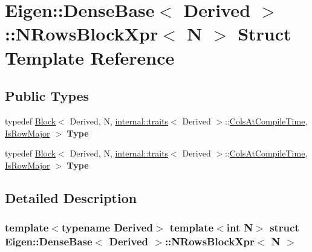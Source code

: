 \hypertarget{struct_eigen_1_1_dense_base_1_1_n_rows_block_xpr}{}\section{Eigen\+:\+:Dense\+Base$<$ Derived $>$\+:\+:N\+Rows\+Block\+Xpr$<$ N $>$ Struct Template Reference}
\label{struct_eigen_1_1_dense_base_1_1_n_rows_block_xpr}
\subsection*{Public Types}
\begin{DoxyCompactItemize}
\item 
\mbox{\label{struct_eigen_1_1_dense_base_1_1_n_rows_block_xpr_ae950c080aaac60c9937a1fedb93f2340}} 
typedef \hyperlink{group___core___module_class_eigen_1_1_block}{Block}$<$ Derived, N, \hyperlink{struct_eigen_1_1internal_1_1traits}{internal\+::traits}$<$ Derived $>$\+::\hyperlink{group___core___module_a9784b8701c2d1c79fa8000e1b3ebdb8bac1b474fd08671c39df677c4acdbc8df0}{Cols\+At\+Compile\+Time}, \hyperlink{group___core___module_a9784b8701c2d1c79fa8000e1b3ebdb8baff2add9b7e8426ba05be33f32806d21c}{Is\+Row\+Major} $>$ {\bfseries Type}
\item 
\mbox{\label{struct_eigen_1_1_dense_base_1_1_n_rows_block_xpr_ae950c080aaac60c9937a1fedb93f2340}} 
typedef \hyperlink{group___core___module_class_eigen_1_1_block}{Block}$<$ Derived, N, \hyperlink{struct_eigen_1_1internal_1_1traits}{internal\+::traits}$<$ Derived $>$\+::\hyperlink{group___core___module_a9784b8701c2d1c79fa8000e1b3ebdb8bac1b474fd08671c39df677c4acdbc8df0}{Cols\+At\+Compile\+Time}, \hyperlink{group___core___module_a9784b8701c2d1c79fa8000e1b3ebdb8baff2add9b7e8426ba05be33f32806d21c}{Is\+Row\+Major} $>$ {\bfseries Type}
\end{DoxyCompactItemize}


\subsection{Detailed Description}
\subsubsection*{template$<$typename Derived$>$\newline
template$<$int N$>$\newline
struct Eigen\+::\+Dense\+Base$<$ Derived $>$\+::\+N\+Rows\+Block\+Xpr$<$ N $>$}



